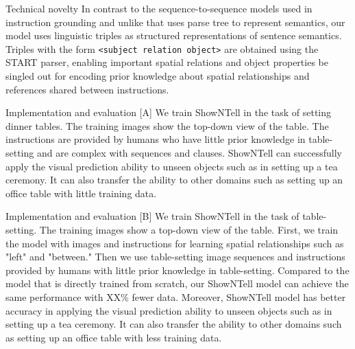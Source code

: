 \documentclass[conference]{IEEEtran}
\newenvironment{statement1}%
  {\begin{mdframed}[backgroundcolor=lightcyan,
  					topline=false,
  					rightline=false,
  					leftline=false,
  					bottomline=false
  					]\smallskip}%
  {\smallskip\end{mdframed}}
\newenvironment{statement2}%
  {\begin{mdframed}[backgroundcolor=lightyellow,
  					topline=false,
  					rightline=false,
  					leftline=false,
  					bottomline=false
  					]\smallskip}%
  {\smallskip\end{mdframed}}
\begin{document}
\color{red} Technical novelty \color{black} In contrast to the sequence-to-sequence models used in instruction grounding and unlike \cite{andreas2016neural} that uses parse tree to represent semantics, our model uses linguistic triples as structured representations of sentence semantics. Triples with the form \texttt{<subject relation object>} are obtained using the START parser, enabling important spatial relations and object properties be singled out for encoding prior knowledge about spatial relationships and references shared between instructions.


\begin{statement1}
\color{red} Implementation and evaluation [A] \color{black} We train ShowNTell in the task of setting dinner tables. The training images show the top-down view of the table. The instructions are provided by humans who have little prior knowledge in table-setting and are complex with sequences and clauses. ShowNTell can successfully apply the visual prediction ability to unseen objects such as in setting up a tea ceremony. It can also transfer the ability to other domains such as setting up an office table with little training data.

\end{statement1}

\begin{statement2}
\color{red} Implementation and evaluation [B] \color{black} We train ShowNTell in the task of table-setting. The training images show a top-down view of the table. First, we train the model with images and instructions for learning spatial relationships such as "left" and "between." Then we use table-setting image sequences and instructions provided by humans with little prior knowledge in table-setting. Compared to the model that is directly trained from scratch, our ShowNTell model can achieve the same performance with XX\% fewer data. Moreover, ShowNTell model has better accuracy in applying the visual prediction ability to unseen objects such as in setting up a tea ceremony. It can also transfer the ability to other domains such as setting up an office table with less training data.
\end{statement2}
\end{document}
